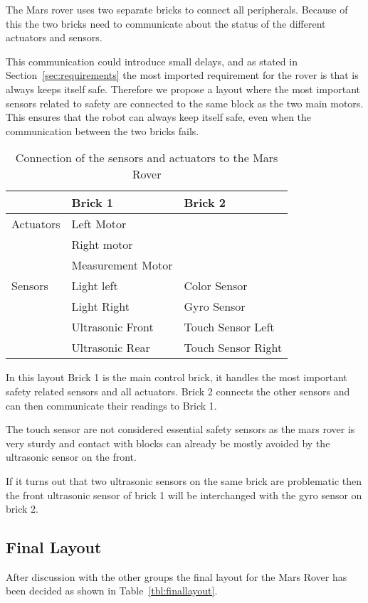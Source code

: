 The Mars rover uses two separate bricks to connect all peripherals. Because of
this the two bricks need to communicate about the status of the different
actuators and sensors. 

This communication could introduce small delays, and as stated in
Section~\ref{sec:requirements} the most imported requirement for the rover is
that is always keeps itself safe. Therefore we propose a layout where the most
important sensors related to safety are connected to the same block as the
two main motors. This ensures that the robot can always keep itself safe,
even when the communication between the two bricks fails.

\begin{table}[H]
	\centering
	\begin{tabular}{|l|l|l|}
		\hline
					& \textbf{Brick 1} & \textbf{Brick 2} \\  \hline
		\hline
		Actuators 	& Left Motor & \\  
					& Right motor & \\  
					& Measurement Motor & \\  
		\hline
		Sensors 	& Light left & Color Sensor \\  
					& Light Right & Gyro Sensor \\  
					& Ultrasonic Front & Touch Sensor Left \\  
					& Ultrasonic Rear & Touch Sensor Right \\  
		\hline
	\end{tabular}
\caption{Connection of the sensors and actuators to the Mars Rover}
\label{tbl:layout}
\end{table}

In this layout Brick 1 is the main control brick, it handles the most important
safety related sensors and all actuators. Brick 2 connects the other sensors and
can then communicate their readings to Brick 1. 

The touch sensor are not considered essential safety sensors as the mars rover
is very sturdy and contact with blocks can already be mostly avoided by the
ultrasonic sensor on the front. 

If it turns out that two ultrasonic sensors on the same brick are problematic
then the front ultrasonic sensor of brick 1 will be interchanged with the
gyro sensor on brick 2. 

\subsection{Final Layout}
After discussion with the other groups the final layout for the Mars Rover has 
been decided as shown in Table~\ref{tbl:finallayout}. 

